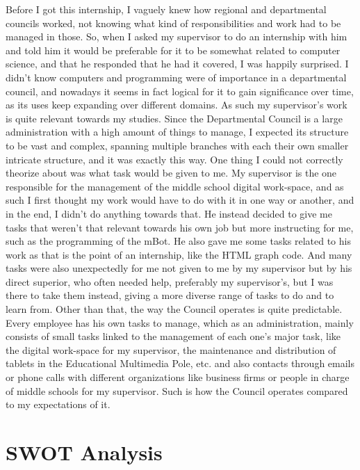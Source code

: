 \documentclass[12pt]{article}
\begin{document}
Before I got this internship, I vaguely knew how regional and departmental councils worked, not knowing what kind of responsibilities and work had to be managed in those. So, when I asked my supervisor to do an internship with him and told him it would be preferable for it to be somewhat related to computer science, and that he responded that he had it covered, I was happily surprised. I didn't know computers and programming were of importance in a departmental council, and nowadays it seems in fact logical for it to gain significance over time, as its uses keep expanding over different domains. As such my supervisor's work is quite relevant towards my studies. Since the Departmental Council is a large administration with a high amount of things to manage, I expected its structure to be vast and complex, spanning multiple branches with each their own smaller intricate structure, and it was exactly this way. One thing I could not correctly theorize about was what task would be given to me. My supervisor is the one responsible for the management of the middle school digital work-space, and as such I first thought my work would have to do with it in one way or another, and in the end, I didn't do anything towards that. He instead decided to give me tasks that weren't that relevant towards his own job but more instructing for me, such as the programming of the mBot. He also gave me some tasks related to his work as that is the point of an internship, like the HTML graph code. And many tasks were also unexpectedly for me not given to me by my supervisor but by his direct superior, who often needed help, preferably my supervisor's, but I was there to take them instead, giving a more diverse range of tasks to do and to learn from. Other than that, the way the Council operates is quite predictable. Every employee has his own tasks to manage, which as an administration, mainly consists of small tasks linked to the management of each one's major task, like the digital work-space for my supervisor, the maintenance and distribution of tablets in the Educational Multimedia Pole, etc. and also contacts through emails or phone calls with different organizations like business firms or people in charge of middle schools for my supervisor. Such is how the Council operates compared to my expectations of it.

\section{SWOT Analysis}
\end{document}
